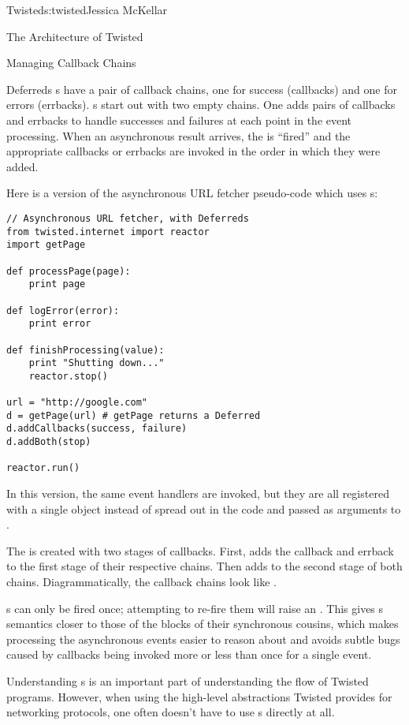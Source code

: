 \begin{aosachapter}{Twisted}{s:twisted}{Jessica McKellar}
\begin{aosasect1}{The Architecture of Twisted}
\begin{aosasect2}{Managing Callback Chains}
\begin{aosasect3}{Deferreds}
s have a pair of callback chains, one for success
(callbacks) and one for errors (errbacks). s start out with
two empty chains. One adds pairs of callbacks and errbacks to handle successes
and failures at each point in the event processing. When an asynchronous result
arrives, the  is ``fired'' and the appropriate callbacks or
errbacks are invoked in the order in which they were added.

Here is a version of the asynchronous URL fetcher pseudo-code which
uses s:

\begin{verbatim}
// Asynchronous URL fetcher, with Deferreds
from twisted.internet import reactor
import getPage

def processPage(page):
    print page

def logError(error):
    print error

def finishProcessing(value):
    print "Shutting down..."
    reactor.stop()

url = "http://google.com"
d = getPage(url) # getPage returns a Deferred
d.addCallbacks(success, failure)
d.addBoth(stop)

reactor.run()
\end{verbatim}

In this version, the same event handlers are invoked, but they are all
registered with a single  object instead of spread out in
the code and passed as arguments to .

The  is created with two stages of callbacks. First,
 adds the  callback and
 errback to the first stage of their respective
chains. Then  adds  to the second
stage of both chains. Diagrammatically, the callback chains look like
.


s can only be fired once; attempting to re-fire them
will raise an . This gives s
semantics closer to those of the  blocks of their synchronous
cousins, which makes processing the asynchronous events easier to reason about
and avoids subtle bugs caused by callbacks being invoked more or less than once
for a single event.

Understanding s is an important part of understanding
the flow of Twisted programs. However, when using the high-level abstractions
Twisted provides for networking protocols, one often doesn't have to use
s directly at all.


\end{aosasect3}
\end{aosasect2}
\end{aosasect1}
\end{aosachapter}
